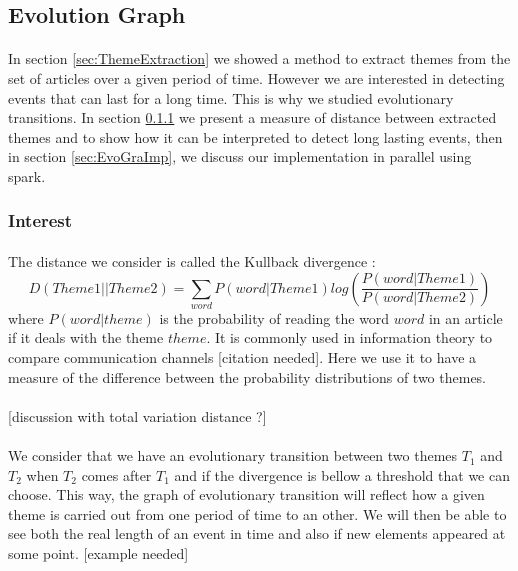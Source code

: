 \subsection{Evolution Graph}
\paragraph{}
In section \ref{sec:ThemeExtraction} we showed a method to extract themes from the set of articles over a given period of time. However we are interested in detecting events that can last for a long time. This is why we studied evolutionary transitions. In section \ref{sec:EvoGraInt} we present a measure of distance between extracted themes and to show how it can be interpreted to detect long lasting events, then in section \ref{sec:EvoGraImp}, we discuss our implementation in parallel using spark.

\subsubsection{Interest}
\label{sec:EvoGraInt}

\paragraph{}
The distance we consider is called the Kullback divergence :\[ D(Theme1 || Theme2) = \sum_{word} P(word|Theme1) log(\frac{P(word|Theme1)}{P(word|Theme2)})\]where $P(word|theme)$ is the probability of reading the word $word$ in an article if it deals with the theme $theme$. It is commonly used in information theory to compare communication channels [citation needed]. Here we use it to have a measure of the difference between the probability distributions of two themes. 

\paragraph{}
[discussion with total variation distance ?]

\paragraph{}
We consider that we have an evolutionary transition between two themes $T_1$ and $T_2$ when $T_2$ comes after $T_1$ and if the divergence is bellow a threshold that we can choose. This way, the graph of evolutionary transition will reflect how a given theme is carried out from one period of time to an other. We will then be able to see both the real length of an event in time and also if new elements appeared at some point. [example needed]

